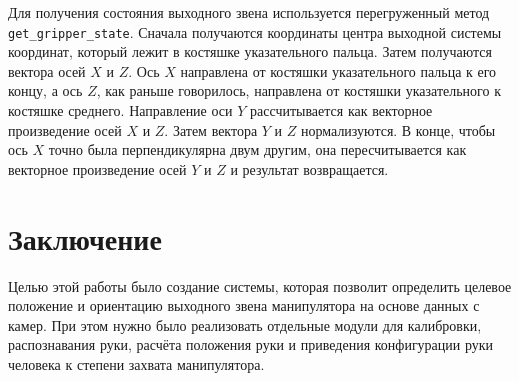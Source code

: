 \documentclass[14pt, a4paper]{extarticle}
\begin{document}
Для получения состояния выходного звена используется перегруженный метод
\texttt{get\_gripper\_state}. Сначала получаются координаты центра выходной
системы координат, который лежит в костяшке указательного пальца.
Затем получаются вектора осей $X$ и $Z$. Ось $X$ направлена от костяшки
указательного пальца к его концу, а ось $Z$, как раньше говорилось,
направлена от костяшки указательного к костяшке среднего.
Направление оси $Y$ рассчитывается как векторное произведение осей $X$ и $Z$.
Затем вектора $Y$ и $Z$ нормализуются.
В конце, чтобы ось $X$ точно была перпендикулярна двум другим, она
пересчитывается как векторное произведение осей $Y$ и $Z$ и результат
возвращается.

 
\section{Заключение}
Целью этой работы было создание системы, которая позволит определить целевое
положение и ориентацию выходного звена манипулятора на основе данных с камер.
При этом нужно было реализовать отдельные модули для калибровки, распознавания
руки, расчёта положения руки и приведения конфигурации руки человека к степени
захвата манипулятора.
  
\end{document}
